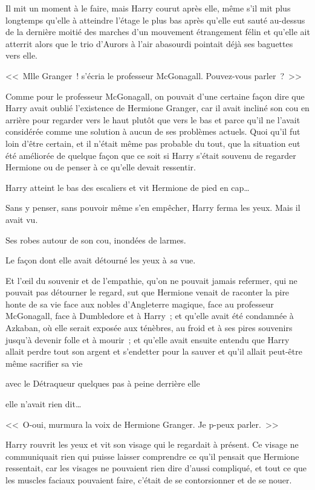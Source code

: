 Il mit un moment à le faire, mais Harry courut après elle, même s'il mit plus longtemps qu'elle à atteindre l'étage le plus bas après qu'elle eut sauté au-dessus de la dernière moitié des marches d'un mouvement étrangement félin et qu'elle ait atterrit alors que le trio d'Aurors à l'air abasourdi pointait déjà ses baguettes vers elle.

<<~Mlle Granger~! s'écria le professeur McGonagall. Pouvez-vous parler~?~>>

Comme pour le professeur McGonagall, on pouvait d'une certaine façon dire que Harry avait oublié l'existence de Hermione Granger, car il avait incliné son cou en arrière pour regarder vers le haut plutôt que vers le bas et parce qu'il ne l'avait considérée comme une solution à aucun de ses problèmes actuels. Quoi qu'il fut loin d'être certain, et il n'était même pas probable du tout, que la situation eut été améliorée de quelque façon que ce soit si Harry s'était souvenu de regarder Hermione ou de penser à ce qu'elle devait ressentir.

Harry atteint le bas des escaliers et vit Hermione de pied en cap…

Sans y penser, sans pouvoir même s'en empêcher, Harry ferma les yeux. Mais il avait vu.

Ses robes autour de son cou, inondées de larmes.

Le façon dont elle avait détourné les yeux à \emph{sa} vue.

Et l'œil du souvenir et de l'empathie, qu'on ne pouvait jamais refermer, qui ne pouvait pas détourner le regard, sut que Hermione venait de raconter la pire honte de sa vie face aux nobles d'Angleterre magique, face au professeur McGonagall, face à Dumbledore et à Harry~; et qu'elle avait été condamnée à Azkaban, où elle serait exposée aux ténèbres, au froid et à ses pires souvenirs jusqu'à devenir folle et à mourir~; et qu'elle avait ensuite entendu que Harry allait perdre tout son argent et s'endetter pour la sauver et qu'il allait peut-être même sacrifier sa vie

avec le Détraqueur quelques pas à peine derrière elle

elle n'avait rien dit…

<<~O-oui, murmura la voix de Hermione Granger. Je p-peux parler.~>>

Harry rouvrit les yeux et vit son visage qui le regardait à présent. Ce visage ne communiquait rien qui puisse laisser comprendre ce qu'il pensait que Hermione ressentait, car les visages ne pouvaient rien dire d'aussi compliqué, et tout ce que les muscles faciaux pouvaient faire, c'était de se contorsionner et de se nouer.

